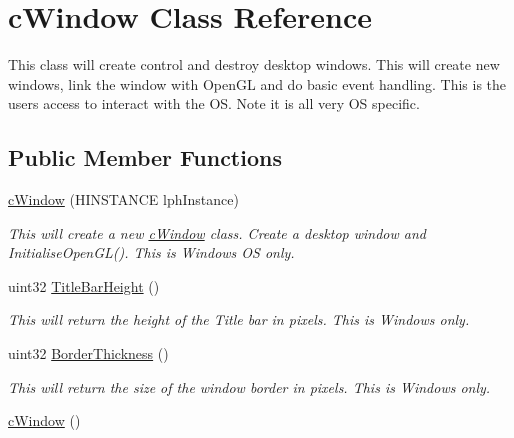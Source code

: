 \hypertarget{classc_window}{
\section{cWindow Class Reference}
\label{classc_window}
}


This class will create control and destroy desktop windows. This will create new windows, link the window with OpenGL and do basic event handling. This is the users access to interact with the OS. Note it is all very OS specific.  


\subsection*{Public Member Functions}
\begin{DoxyCompactItemize}
\item 
\hypertarget{classc_window_ae87d783f8bc3e30f751764ac6b078c38}{
\hyperlink{classc_window_ae87d783f8bc3e30f751764ac6b078c38}{cWindow} (HINSTANCE lphInstance)}
\label{classc_window_ae87d783f8bc3e30f751764ac6b078c38}

\begin{DoxyCompactList}\small\item\em This will create a new \hyperlink{classc_window}{cWindow} class. Create a desktop window and InitialiseOpenGL(). This is Windows OS only. \end{DoxyCompactList}\item 
\hypertarget{classc_window_a5aae14fd8a5b2f5c98cb24e54bdd652b}{
uint32 \hyperlink{classc_window_a5aae14fd8a5b2f5c98cb24e54bdd652b}{TitleBarHeight} ()}
\label{classc_window_a5aae14fd8a5b2f5c98cb24e54bdd652b}

\begin{DoxyCompactList}\small\item\em This will return the height of the Title bar in pixels. This is Windows only. \end{DoxyCompactList}\item 
\hypertarget{classc_window_a95562b930e5124d792cd75358bc9533f}{
uint32 \hyperlink{classc_window_a95562b930e5124d792cd75358bc9533f}{BorderThickness} ()}
\label{classc_window_a95562b930e5124d792cd75358bc9533f}

\begin{DoxyCompactList}\small\item\em This will return the size of the window border in pixels. This is Windows only. \end{DoxyCompactList}\item 
\hypertarget{classc_window_a240840abcf5c64260f5fb43474f70084}{
\hyperlink{classc_window_a240840abcf5c64260f5fb43474f70084}{cWindow} ()}
\label{classc_window_a240840abcf5c64260f5fb43474f70084}


\end{DoxyCompactItemize}

